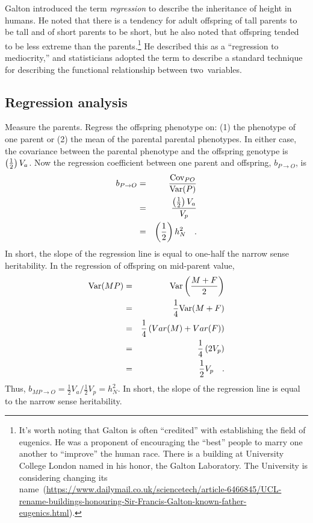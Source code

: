 \documentclass[12pt]{article}
\begin{document}
Galton introduced the term {\it regression\/} to describe the
inheritance of height in humans. He noted that there is a tendency for
adult offspring of tall parents to be tall and of short parents to be
short, but he also noted that offspring tended to be less extreme than
the parents.\footnote{It's worth noting that Galton is often
  ``credited'' with establishing the field of eugenics. He was a
  proponent of encouraging the ``best'' people to marry one another to
  ``improve'' the human race. There is a building at University
  College London named in his honor, the Galton Laboratory. The
  University is considering changing its
  name~(\url{https://www.dailymail.co.uk/sciencetech/article-6466845/UCL-rename-buildings-honouring-Sir-Francis-Galton-known-father-eugenics.html}).}
He described this as a ``regression to mediocrity,'' and statisticians
adopted the term to describe a standard technique for describing the
functional relationship between two~variables.

\subsection*{Regression analysis}

Measure the parents.  Regress the offspring phenotype on: (1) the
phenotype of one parent or (2) the mean of the parental parental
phenotypes.  In either case, the covariance between the parental
phenotype and the offspring genotype is $\left({1 \over 2}\right)V_a$.
Now the regression coefficient between one parent and offspring, $b_{P
\rightarrow O}$, is
\begin{eqnarray*}
b_{P \rightarrow O}
&=& \frac{\mbox{Cov}_{PO}}{\mbox{Var}(P)} \\
&=& {\left({1 \over 2}\right)V_a \over V_p} \\
&=& \left({1 \over 2}\right)h^2_N \quad .
\end{eqnarray*}
In short, the slope of the regression line is equal to one-half the
narrow sense heritability.  In the regression of offspring on
mid-parent value,
\begin{eqnarray*}
\mbox{Var}(MP) &=& \mbox{Var}\left(\frac{M+F}{2}\right) \\
                  &=& \frac{1}{4} \mbox{Var}(M+F) \\
                  &=& \frac{1}{4} \left(Var(M) + Var(F)\right) \\
                  &=& \frac{1}{4} \left(2V_p\right) \\
                  &=& \frac{1}{2} V_p \quad .
\end{eqnarray*}
Thus, $b_{MP \rightarrow O} = \frac{1}{2}V_a/\frac{1}{2}V_p = h^2_N$.
In short, the slope of the regression line is equal to the narrow
sense heritability.
\end{document}
